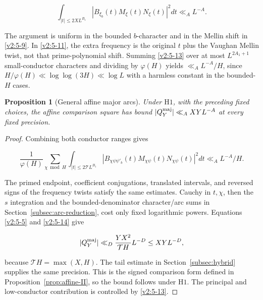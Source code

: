 \documentclass[11pt]{article}
\newtheorem{proposition}[theorem]{Proposition}
\theoremstyle{definition}
\theoremstyle{remark}
\numberwithin{equation}{section}
\begin{document}
\begin{equation}\label{v2:5-13}
\int_{|t|\le2XL^{B_1}}|B_{\xi_b}(t)M_\xi(t)N_\xi(t)|^2dt\ll_A L^{-A}.
\end{equation}


The argument is uniform in the bounded $b$-character and in the Mellin shift in \eqref{v2:5-9}. In \eqref{v2:5-11}, the extra frequency is the original $t$ plus the Vaughan Mellin twist, not that prime-polynomial shift. Summing \eqref{v2:5-13} over at most $L^{2A_1+1}$ small-conductor characters and dividing by $\varphi(H)$ yields $\ll_A L^{-A}/H$, since $H/\varphi(H)\ll\log\log(3H)\ll\log L$ with a harmless constant in the bounded-$H$ cases.

\begin{proposition}[General affine major arcs]\label{prop:hybrid-major}
Under $\mathrm H1$, with the preceding fixed choices, the
affine comparison square has bound
$|Q_Y^{\rm maj}|\ll_A XYL^{-A}$ at every fixed precision.
\end{proposition}
\begin{proof}
Combining both conductor ranges gives


\begin{equation}\label{v2:5-14}
\frac1{\varphi(H)}\sum_{\chi\bmod H}\int_{|t|\le2\mathcal T L^{B_1}}
 |B_{\chi\psi\psi'_b}(t)M_{\chi\psi}(t)N_{\chi\psi}(t)|^2dt
\ll_A L^{-A}/H.
\end{equation}


The primed endpoint, coefficient conjugations, translated intervals, and reversed signs of the frequency twists satisfy the same estimates. Cauchy in $t,\chi$, then the $s$ integration and the bounded-denominator character/arc sums in Section~\ref{subsec:arc-reduction}, cost only fixed logarithmic powers. Equations \eqref{v2:5-5} and \eqref{v2:5-14} give


\begin{equation}\label{v2:5-15}
|Q_Y^{\rm maj}|\ll_D\frac{YX^2}{\mathcal T H}L^{-D}
\le XYL^{-D},
\end{equation}


because $\mathcal T H=\max(X,H)$. The tail estimate in Section~\ref{subsec:hybrid} supplies the same precision. This is the signed comparison form defined in Proposition~\ref{prop:affine-II}, so the bound follows under $\mathrm H1$. The principal and low-conductor contribution is controlled by \eqref{v2:5-13}.

\end{proof}
\end{document}
